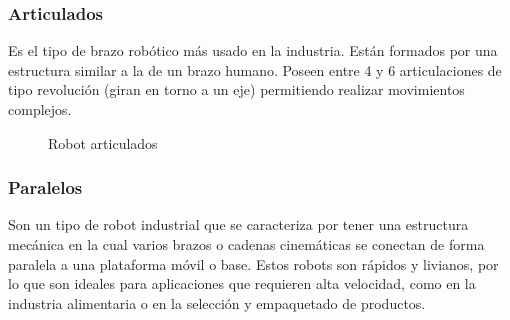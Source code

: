\subsubsection{Articulados}
Es el tipo de brazo robótico más usado en la industria. Están formados por una estructura similar a la de un brazo humano. Poseen entre 4 y 6 articulaciones de tipo 
revolución (giran en torno a un eje) permitiendo realizar movimientos complejos. 
\begin{figure} [h!]
  \centering    
  \hspace{1.5cm}
  \caption{Robot articulados}
\end{figure}

\subsubsection{Paralelos}
\label{sec:paralelogramos}
Son un tipo de robot industrial que se caracteriza por tener una estructura mecánica en la cual varios brazos o cadenas cinemáticas se conectan de forma paralela a una plataforma móvil o 
base. Estos robots son rápidos y livianos, por lo que son ideales para aplicaciones que requieren alta velocidad, como en la industria alimentaria o en la selección y
empaquetado de productos.

